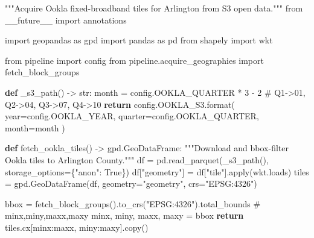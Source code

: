 \documentclass[
  letterpaper,
  DIV=11,
  numbers=noendperiod]{scrreprt}
\newenvironment{Shaded}{\begin{snugshade}}{\end{snugshade}}
\newcommand{\BuiltInTok}[1]{\textcolor[rgb]{0.00,0.23,0.31}{#1}}
\newcommand{\CommentTok}[1]{\textcolor[rgb]{0.37,0.37,0.37}{#1}}
\newcommand{\ControlFlowTok}[1]{\textcolor[rgb]{0.00,0.23,0.31}{\textbf{#1}}}
\newcommand{\DecValTok}[1]{\textcolor[rgb]{0.68,0.00,0.00}{#1}}
\newcommand{\ImportTok}[1]{\textcolor[rgb]{0.00,0.46,0.62}{#1}}
\newcommand{\KeywordTok}[1]{\textcolor[rgb]{0.00,0.23,0.31}{\textbf{#1}}}
\newcommand{\NormalTok}[1]{\textcolor[rgb]{0.00,0.23,0.31}{#1}}
\newcommand{\OperatorTok}[1]{\textcolor[rgb]{0.37,0.37,0.37}{#1}}
\newcommand{\StringTok}[1]{\textcolor[rgb]{0.13,0.47,0.30}{#1}}
\newcommand{\VariableTok}[1]{\textcolor[rgb]{0.07,0.07,0.07}{#1}}
\begin{document}
\begin{Shaded}
\begin{Highlighting}[]
\CommentTok{"""Acquire Ookla fixed{-}broadband tiles for Arlington from S3 open data."""}
\ImportTok{from}\NormalTok{ \_\_future\_\_ }\ImportTok{import}\NormalTok{ annotations}

\ImportTok{import}\NormalTok{ geopandas }\ImportTok{as}\NormalTok{ gpd}
\ImportTok{import}\NormalTok{ pandas }\ImportTok{as}\NormalTok{ pd}
\ImportTok{from}\NormalTok{ shapely }\ImportTok{import}\NormalTok{ wkt}

\ImportTok{from}\NormalTok{ pipeline }\ImportTok{import}\NormalTok{ config}
\ImportTok{from}\NormalTok{ pipeline.acquire\_geographies }\ImportTok{import}\NormalTok{ fetch\_block\_groups}


\KeywordTok{def}\NormalTok{ \_s3\_path() }\OperatorTok{{-}\textgreater{}} \BuiltInTok{str}\NormalTok{:}
\NormalTok{    month }\OperatorTok{=}\NormalTok{ config.OOKLA\_QUARTER }\OperatorTok{*} \DecValTok{3} \OperatorTok{{-}} \DecValTok{2}  \CommentTok{\# Q1{-}\textgreater{}01, Q2{-}\textgreater{}04, Q3{-}\textgreater{}07, Q4{-}\textgreater{}10}
    \ControlFlowTok{return}\NormalTok{ config.OOKLA\_S3.}\BuiltInTok{format}\NormalTok{(}
\NormalTok{        year}\OperatorTok{=}\NormalTok{config.OOKLA\_YEAR, quarter}\OperatorTok{=}\NormalTok{config.OOKLA\_QUARTER, month}\OperatorTok{=}\NormalTok{month}
\NormalTok{    )}


\KeywordTok{def}\NormalTok{ fetch\_ookla\_tiles() }\OperatorTok{{-}\textgreater{}}\NormalTok{ gpd.GeoDataFrame:}
    \CommentTok{"""Download and bbox{-}filter Ookla tiles to Arlington County."""}
\NormalTok{    df }\OperatorTok{=}\NormalTok{ pd.read\_parquet(\_s3\_path(), storage\_options}\OperatorTok{=}\NormalTok{\{}\StringTok{"anon"}\NormalTok{: }\VariableTok{True}\NormalTok{\})}
\NormalTok{    df[}\StringTok{"geometry"}\NormalTok{] }\OperatorTok{=}\NormalTok{ df[}\StringTok{"tile"}\NormalTok{].}\BuiltInTok{apply}\NormalTok{(wkt.loads)}
\NormalTok{    tiles }\OperatorTok{=}\NormalTok{ gpd.GeoDataFrame(df, geometry}\OperatorTok{=}\StringTok{"geometry"}\NormalTok{, crs}\OperatorTok{=}\StringTok{"EPSG:4326"}\NormalTok{)}

\NormalTok{    bbox }\OperatorTok{=}\NormalTok{ fetch\_block\_groups().to\_crs(}\StringTok{"EPSG:4326"}\NormalTok{).total\_bounds  }\CommentTok{\# minx,miny,maxx,maxy}
\NormalTok{    minx, miny, maxx, maxy }\OperatorTok{=}\NormalTok{ bbox}
    \ControlFlowTok{return}\NormalTok{ tiles.cx[minx:maxx, miny:maxy].copy()}



\end{Highlighting}
\end{Shaded}
\end{document}
